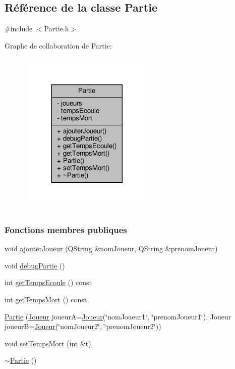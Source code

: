\hypertarget{class_partie}{}\subsection{Référence de la classe Partie}
\label{class_partie}


{\ttfamily \#include $<$Partie.\+h$>$}



Graphe de collaboration de Partie\+:
\nopagebreak
\begin{figure}[H]
\begin{center}
\leavevmode
\includegraphics[width=185pt]{class_partie__coll__graph}
\end{center}
\end{figure}
\subsubsection*{Fonctions membres publiques}
\begin{DoxyCompactItemize}
\item 
void \hyperlink{class_partie_ab9900d3b66d9ac7eabc837c790faa6b8}{ajouter\+Joueur} (Q\+String \&nom\+Joueur, Q\+String \&prenom\+Joueur)
\item 
void \hyperlink{class_partie_aea05906078462b32bf08a3172ab14328}{debug\+Partie} ()
\item 
int \hyperlink{class_partie_ab5bb77bcbdb9a145016ebb4ff2bf6c38}{get\+Temps\+Ecoule} () const
\item 
int \hyperlink{class_partie_ad78c6daffd7a676ce6c0a8e511991a75}{get\+Temps\+Mort} () const
\item 
\hyperlink{class_partie_ae1a2da8080f9f51bdd7e9d864080444c}{Partie} (\hyperlink{class_joueur}{Joueur} joueurA=\hyperlink{class_joueur}{Joueur}(\char`\"{}nom\+Joueur1\char`\"{}, \char`\"{}prenom\+Joueur1\char`\"{}), Joueur joueurB=\hyperlink{class_joueur}{Joueur}(\char`\"{}nom\+Joueur2\char`\"{}, \char`\"{}prenom\+Joueur2\char`\"{}))
\item 
void \hyperlink{class_partie_a4c9c799ba4057c15c0600bdf8b7f296f}{set\+Temps\+Mort} (int \&t)
\item 
\hyperlink{class_partie_ae4afeb7336bb84427272cfb7018b5e3d}{$\sim$\+Partie} ()
\end{DoxyCompactItemize}
